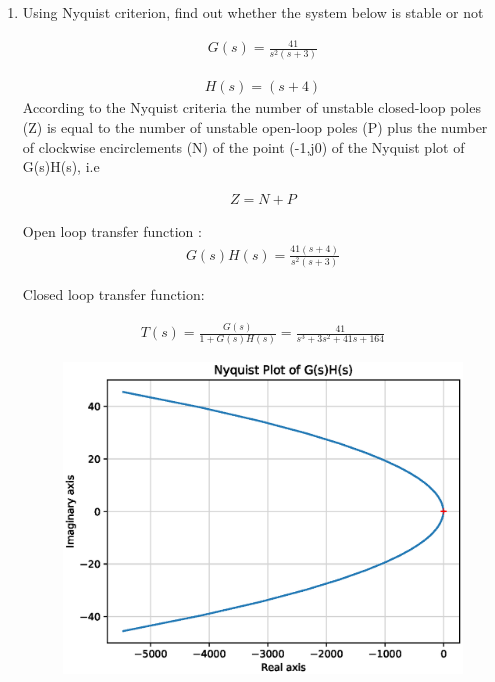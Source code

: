 \begin{enumerate}[label=\thesection.\arabic*.,ref=\thesection.\theenumi]
\item Using Nyquist criterion, find out whether the system below is stable or not

\begin{align}
    G(s)= \frac{41}{s^2(s+3)}
    \label{eq:ee18btech11041_1}
\end{align}

\begin{align}
    H(s)= (s+4)
    \label{eq:ee18btech11041_2}
\end{align}
\solution 
According to the Nyquist criteria the number of unstable closed-loop poles (Z) is equal to the number of unstable open-loop poles (P) plus the number of clockwise encirclements (N) of the point (-1,j0) of the Nyquist plot of G(s)H(s), i.e

\begin{align}
    Z=N+P
    \label{eq:ee18btech11041_3}
\end{align}

Open loop transfer function :
\begin{align}
    G(s)H(s)=\frac{41(s+4)}{s^2(s+3)}
    \label{eq:ee18btech11041_4}
\end{align}

Closed loop transfer function:

\begin{align}
   T(s)= \frac{G(s)}{1+G(s)H(s)}=\frac{41}{s^3+3s^2+41s+164}
\end{align}

\begin{figure}[!h]
    \includegraphics[width=\columnwidth]{./figs/ee18btech11041_1.eps}
    \caption{}
    \label{fig:1}
\end{figure}


\end{enumerate}

